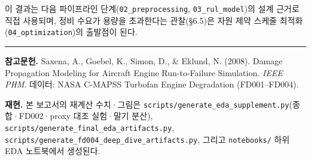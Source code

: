 \documentclass[11pt]{article}
\begin{document}
이 결과는 다음 파이프라인 단계(\texttt{02\_preprocessing}, \texttt{03\_rul\_model})의 설계 근거로 직접 사용되며,
정비 수요가 용량을 초과한다는 관찰(\S6.5)은 자원 제약 스케줄 최적화(\texttt{04\_optimization})의 출발점이 된다.

\vspace{1em}
\hrule
\vspace{0.6em}
\small
\textbf{참고문헌.}
Saxena, A., Goebel, K., Simon, D., \& Eklund, N. (2008). Damage Propagation Modeling for Aircraft Engine Run-to-Failure Simulation. \textit{IEEE PHM}.
\quad 데이터: NASA C-MAPSS Turbofan Engine Degradation (FD001--FD004).

\textbf{재현.}
본 보고서의 재계산 수치·그림은 \texttt{scripts/generate\_eda\_supplement.py}(종합·FD002·proxy 대조 실험·말기 분산),
\texttt{scripts/generate\_final\_eda\_artifacts.py}, \texttt{scripts/generate\_fd004\_deep\_dive\_artifacts.py},
그리고 \texttt{notebooks/} 하위 EDA 노트북에서 생성된다.
\end{document}

